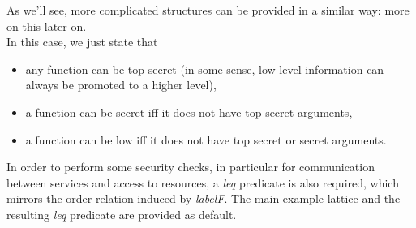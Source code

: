 \documentclass[../DraftNotes.tex]{subfiles}
\begin{document}
As we'll see, more complicated structures can be provided in a similar way: more on this later on. \\
In this case, we just state that
\begin{itemize}
	\item any function can be top secret (in some sense, low level information can always be promoted to a higher level),
	\item a function can be secret iff it does not have top secret arguments,
	\item a function can be low iff it does not have top secret or secret arguments.
\end{itemize}

In order to perform some security checks, in particular for communication between services and access to resources, a \emph{leq} predicate is also required, which mirrors the order relation induced by \emph{labelF}. The main example lattice and the resulting \emph{leq} predicate are provided as default.
\end{document}
